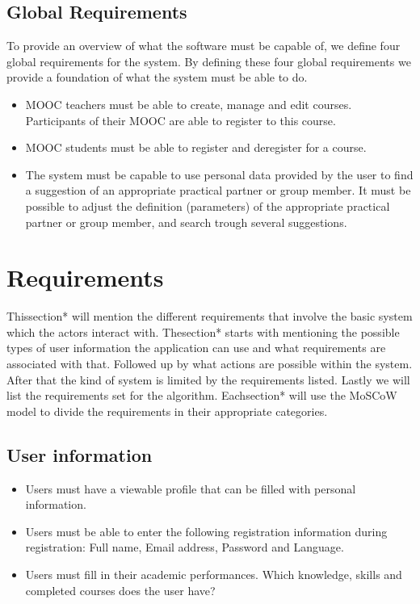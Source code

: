 \subsection*{Global Requirements}
To provide an overview of what the software must be capable of, we define four global requirements for the system.
By defining these four global requirements we provide a foundation of what the system must be able to do.
\begin{itemize}
\item  MOOC teachers must be able to create, manage and edit courses.
Participants of their MOOC are able to register to this course.

\item MOOC students must be able to register and deregister for a course.

\item The system must be capable to use personal data provided by the user to find a suggestion of an appropriate practical partner or group member.
It must be possible to adjust the definition (parameters) of the appropriate practical partner or group member, and search trough several suggestions.
\end{itemize}

\section*{Requirements}
Thissection* will mention the different requirements that involve the basic system which the actors interact with.
Thesection* starts with mentioning the possible types of user information the application can use and what requirements are associated with that.
Followed up by what actions are possible within the system.
After that the kind of system is limited by the requirements listed.
Lastly we will list the requirements set for the algorithm.
Eachsection* will use the MoSCoW model to divide the requirements in their appropriate categories.


\subsection*{User information}
\begin{itemize}
\item Users must have a viewable profile that can be filled with personal information.
\item Users must be able to enter the following registration information during registration: Full name, Email address, Password and Language.
\item Users must fill in their academic performances. Which knowledge, skills and completed courses does the user have?
\end{itemize}

